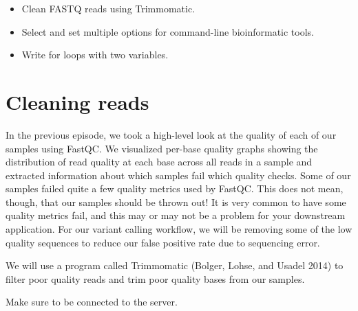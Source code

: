 \documentclass[
  letterpaper,
  DIV=11,
  numbers=noendperiod]{scrreprt}
\providecommand{\tightlist}{%
  \setlength{\itemsep}{0pt}\setlength{\parskip}{0pt}}\usepackage{longtable,booktabs,array}
\begin{document}
\begin{tcolorbox}[enhanced jigsaw, toptitle=1mm, breakable, bottomrule=.15mm, colback=white, toprule=.15mm, opacityback=0, bottomtitle=1mm, coltitle=black, opacitybacktitle=0.6, rightrule=.15mm, colframe=quarto-callout-important-color-frame, titlerule=0mm, colbacktitle=quarto-callout-important-color!10!white, title={🎯 Objectives}, left=2mm, leftrule=.75mm, arc=.35mm]

\begin{itemize}
\tightlist
\item
  Clean FASTQ reads using Trimmomatic.
\item
  Select and set multiple options for command-line bioinformatic tools.
\item
  Write for loops with two variables.
\end{itemize}

\end{tcolorbox}

\hypertarget{cleaning-reads}{%
\section{Cleaning reads}\label{cleaning-reads}}

In the previous episode, we took a high-level look at the quality of
each of our samples using FastQC. We visualized per-base quality graphs
showing the distribution of read quality at each base across all reads
in a sample and extracted information about which samples fail which
quality checks. Some of our samples failed quite a few quality metrics
used by FastQC. This does not mean, though, that our samples should be
thrown out! It is very common to have some quality metrics fail, and
this may or may not be a problem for your downstream application. For
our variant calling workflow, we will be removing some of the low
quality sequences to reduce our false positive rate due to sequencing
error.

We will use a program called Trimmomatic (Bolger, Lohse, and Usadel
2014) to filter poor quality reads and trim poor quality bases from our
samples.

\begin{tcolorbox}[enhanced jigsaw, toptitle=1mm, breakable, bottomrule=.15mm, colback=white, toprule=.15mm, opacityback=0, bottomtitle=1mm, coltitle=black, opacitybacktitle=0.6, rightrule=.15mm, colframe=quarto-callout-important-color-frame, titlerule=0mm, colbacktitle=quarto-callout-important-color!10!white, title=\textcolor{quarto-callout-important-color}{\faExclamation}\hspace{0.5em}{Important}, left=2mm, leftrule=.75mm, arc=.35mm]

Make sure to be connected to the server.

\end{tcolorbox}
\end{document}

